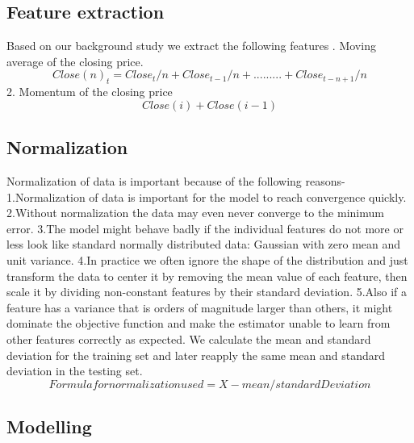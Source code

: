 \documentclass{report}
\begin{document}
\subsection{Feature extraction}
Based on our background study we extract the following features \newline{}. Moving average of the closing price.\newline\newline
		$$Close(n)_{t} = Close_{t}/n + Close_{t-1}/n + ......... + Close_{t-n+1}/n$$
2. Momentum of the closing price\newline
   $$Close(i) + Close(i-1)$$\newline\newline
\newpage
\subsection{Normalization}
Normalization of data is important because of the following reasons-
\newline\newline
1.Normalization of data is important for the model to reach convergence quickly.\newline\newline  
2.Without normalization the data may even never converge to the minimum error.\newline\newline
3.The model might behave badly if the individual features do not more or less look like standard normally distributed data: Gaussian with zero mean and unit variance.\newline\newline
4.In practice we often ignore the shape of the distribution and just transform the data to center it by removing the mean value of each feature, then scale it by dividing non-constant features by their standard deviation.\newline\newline
5.Also  if a feature has a variance that is orders of magnitude larger than others, it might dominate the objective function and make the estimator unable to learn from other features correctly as expected.
\newline\newline
We calculate the mean and standard deviation for the training set and later reapply the same mean and standard deviation in the testing set.
$$Formula for normalization used = X-mean / standard Deviation$$
\newpage
\subsection{Modelling}
\end{document}
